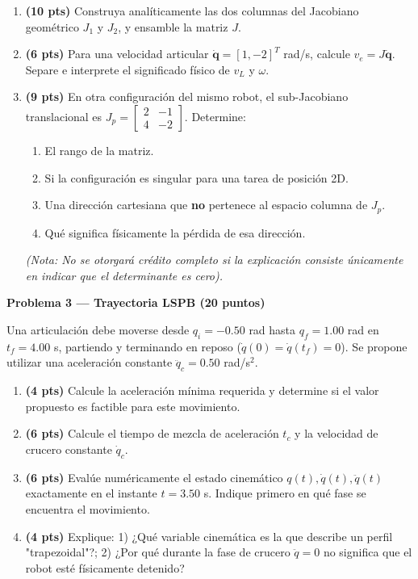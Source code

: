\documentclass[11pt, a4paper]{article}
\begin{document}
\begin{enumerate}[label=\textbf{\alph*)}]
    \item \textbf{(10 pts)} Construya analíticamente las dos columnas del Jacobiano geométrico $J_1$ y $J_2$, y ensamble la matriz $J$. 
    \item \textbf{(6 pts)} Para una velocidad articular $\dot{\mathbf{q}} = [1, -2]^T$ rad/s, calcule $v_e = J\dot{\mathbf{q}}$. Separe e interprete el significado físico de $v_L$ y $\omega$.
    \item \textbf{(9 pts)} En otra configuración del mismo robot, el sub-Jacobiano translacional es $J_p = \begin{bmatrix} 2 & -1 \\ 4 & -2 \end{bmatrix}$. Determine:
    \begin{enumerate}[label=\arabic*.]
        \item El rango de la matriz.
        \item Si la configuración es singular para una tarea de posición 2D.
        \item Una dirección cartesiana que \textbf{no} pertenece al espacio columna de $J_p$.
        \item Qué significa físicamente la pérdida de esa dirección.
    \end{enumerate}
    \textit{(Nota: No se otorgará crédito completo si la explicación consiste únicamente en indicar que el determinante es cero).} 
\end{enumerate}

\noindent\textbf{\large Problema 3 — Trayectoria LSPB (20 puntos)}

Una articulación debe moverse desde $q_i = -0.50$ rad hasta $q_f = 1.00$ rad en $t_f = 4.00$ s, partiendo y terminando en reposo ($\dot{q}(0) = \dot{q}(t_f) = 0$). Se propone utilizar una aceleración constante $\ddot{q}_c = 0.50$ rad/s$^2$.

\begin{enumerate}[label=\textbf{\alph*)}]
    \item \textbf{(4 pts)} Calcule la aceleración mínima requerida y determine si el valor propuesto es factible para este movimiento.
    \item \textbf{(6 pts)} Calcule el tiempo de mezcla de aceleración $t_c$ y la velocidad de crucero constante $\dot{q}_c$.
    \item \textbf{(6 pts)} Evalúe numéricamente el estado cinemático $q(t), \dot{q}(t), \ddot{q}(t)$ exactamente en el instante $t = 3.50$ s. Indique primero en qué fase se encuentra el movimiento.
    \item \textbf{(4 pts)} Explique: 1) ¿Qué variable cinemática es la que describe un perfil "trapezoidal"?; 2) ¿Por qué durante la fase de crucero $\ddot{q} = 0$ no significa que el robot esté físicamente detenido?
\end{enumerate}
\end{document}
